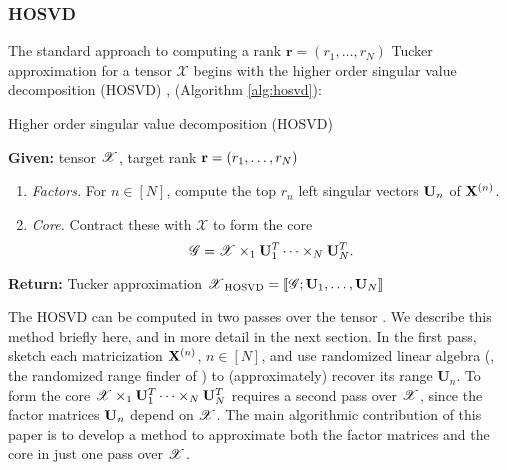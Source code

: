 \subsubsection{HOSVD}
The standard approach to computing a rank $\mathbf{r} = (r_1, \ldots, r_N)$ Tucker approximation for a tensor $\mathscr{X}$
begins with the higher order singular value decomposition (HOSVD) \cite{de2000multilinear,tucker1966some},
(Algorithm \ref{alg:hosvd}): %
\begin{algorithm}[ht]
  \caption{Higher order singular value decomposition (HOSVD)
	\cite{de2000multilinear,tucker1966some}
	\label{alg:hosvd}}
  \textbf{Given:} tensor $\T{X}$, target rank $\mathbf{r} = (r_1, \ldots, r_N)$
  \begin{enumerate}
  \item \emph{Factors.} For $n \in [N]$, compute the top $r_n$ left singular vectors $\mathbf{U}_n$
  of $\mathbf{X}^{(n)}$.
  \item \emph{Core.} Contract these with $\mathscr{X}$ to form the core
  \[
  \T{G} = \T{X} \times_1 \M{U}_1^T \cdots \times_N \M{U}_N^T.
  \]
  \end{enumerate}
  \textbf{Return:} Tucker approximation $\T{X}_{\rm{HOSVD}} = \llbracket\T{G}; \M{U}_1, \ldots, \M{U}_N \rrbracket$
\end{algorithm}

The HOSVD can be computed in two passes over the tensor
\cite{zhou2014decomposition, battaglino2019faster}.
We describe this method briefly here, and in more detail in the next section.
In the first pass, sketch each matricization $\mathbf{X}^{(n)}$, $n \in [N]$,
and use randomized linear algebra
(\eg, the randomized range finder of \cite{halko2011finding})
to (approximately) recover its range $\mathbf{U}_n$.
To form the core $\T{X} \times_1 \M{U}_1^T \cdots \times_N \M{U}_N^T$
requires a second pass over $\T{X}$, since the factor matrices $\mathbf{U}_n$
depend on $\T{X}$.
The main algorithmic contribution of this paper is to develop a method to
approximate both the factor matrices and the core in just one pass over $\T{X}$.

